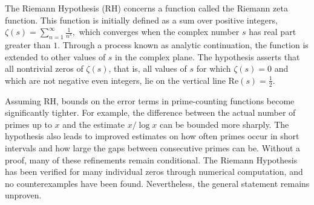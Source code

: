 The Riemann Hypothesis (RH) concerns a function called the Riemann zeta function. This function is initially defined as a sum over positive integers, $\zeta(s) = \sum_{n=1}^\infty \frac{1}{n^s},$
which converges when the complex number $s$ has real part greater than $1$. Through a process known as analytic continuation, the function is extended to other values of $s$ in the complex plane. The hypothesis asserts that all nontrivial zeros of $\zeta(s)$, that is, all values of $s$ for which $\zeta(s) = 0$ and which are not negative even integers, lie on the vertical line $\mathrm{Re}(s) = \tfrac{1}{2}$.

Assuming RH, bounds on the error terms in prime-counting functions become significantly tighter. For example, the difference between the actual number of primes up to $x$ and the estimate $x / \log x$ can be bounded more sharply. The hypothesis also leads to improved estimates on how often primes occur in short intervals and how large the gaps between consecutive primes can be. Without a proof, many of these refinements remain conditional. The Riemann Hypothesis has been verified for many individual zeros through numerical computation, and no counterexamples have been found. Nevertheless, the general statement remains unproven.
\newpage

